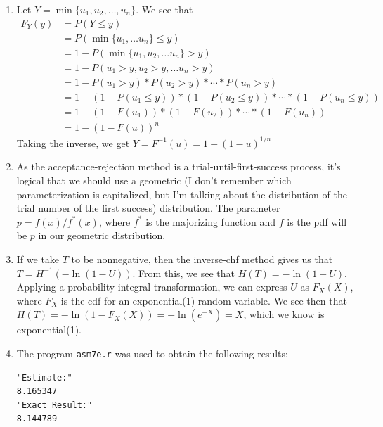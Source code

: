 \documentclass[11pt]{article} %
\newcommand{\inv}{^{-1}}
\begin{document}
\begin{enumerate}
\item Let $Y = \min\{u_1, u_2,\ldots,u_n\}$. We see that
\begin{align*}
F_Y(y) &= P(Y\leq y)\\
&= P(\min\{u_1,\ldots u_n\} \leq y)\\
&= 1 - P(\min\{u_1, u_2, \ldots u_n\} > y)\\
&= 1 - P(u_1 > y, u_2 > y, \ldots u_n > y)\\
&= 1 - P(u_1 > y)*P(u_2 > y)*\cdots*P(u_n > y)\\
&= 1 - (1 - P(u_1 \le y))*(1 - P(u_2 \le y))*\cdots*(1 - P(u_n \le y))\\
&= 1 - (1 - F(u_1))*(1 - F(u_2))*\cdots*(1-F(u_n))\\
&= 1 - (1-F(u))^n\end{align*}
Taking the inverse, we get $Y = F\inv(u) = 1 - (1 - u)^{1/n}$

\item As the acceptance-rejection method is a trial-until-first-success process, it's logical that we should use a geometric (I don't remember which parameterization is capitalized, but I'm talking about the distribution of the trial number of the first success) distribution.  The parameter $p = f(x) / f^*(x)$, where $f^*$ is the majorizing function and $f$ is the pdf will be $p$ in our geometric distribution.

\item If we take $T$ to be nonnegative, then the inverse-chf method gives us that $T = H\inv(-\ln(1 - U))$.  From this, we see that $H(T) = -\ln(1 - U)$.  Applying a probability integral transformation, we can express $U$ as $F_X(X)$, where $F_X$ is the cdf for an exponential(1) random variable.  We see then that $H(T) = -\ln(1 - F_X(X)) = -\ln(e^{-X}) = X$, which we know is exponential(1).

\item The program \texttt{asm7e.r} was used to obtain the following results:

\begin{verbatim}"Estimate:"
8.165347
"Exact Result:"
8.144789\end{verbatim}

\end{enumerate}
\end{document}
